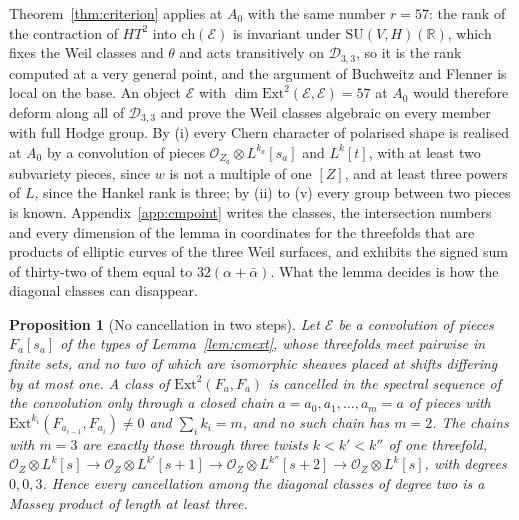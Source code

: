 \documentclass[11pt,reqno]{amsart}
\numberwithin{equation}{section}
\theoremstyle{plain}
\newtheorem{proposition}[theorem]{Proposition}
\theoremstyle{definition}
\newcommand{\RR}{\mathbb{R}}
\newcommand{\Ext}{\mathrm{Ext}}
\newcommand{\ch}{\mathrm{ch}}
\newcommand{\SU}{\mathrm{SU}}
\newcommand{\cD}{\mathcal{D}}
\begin{document}
Theorem~\ref{thm:criterion} applies at $A_{0}$ with the same number $r=57$: the rank of the contraction of $HT^{2}$ into $\ch(\mathcal{E})$ is invariant under $\SU(V,H)(\RR)$, which fixes the Weil classes and $\theta$ and acts transitively on $\cD_{3,3}$, so it is the rank computed at a very general point, and the argument of Buchweitz and Flenner is local on the base. An object $\mathcal{E}$ with $\dim\Ext^{2}(\mathcal{E},\mathcal{E})=57$ at $A_{0}$ would therefore deform along all of $\cD_{3,3}$ and prove the Weil classes algebraic on every member with full Hodge group. By (i) every Chern character of polarised shape is realised at $A_{0}$ by a convolution of pieces $\mathcal{O}_{Z_{a}}\otimes L^{k_{a}}[s_{a}]$ and $L^{k}[t]$, with at least two subvariety pieces, since $w$ is not a multiple of one $[Z]$, and at least three powers of $L$, since the Hankel rank is three; by (ii) to (v) every group between two pieces is known. Appendix~\ref{app:cmpoint} writes the classes, the intersection numbers and every dimension of the lemma in coordinates for the threefolds that are products of elliptic curves of the three Weil surfaces, and exhibits the signed sum of thirty-two of them equal to $32(\alpha+\bar\alpha)$. What the lemma decides is how the diagonal classes can disappear.

\begin{proposition}[No cancellation in two steps]\label{prop:twostep}
Let $\mathcal{E}$ be a convolution of pieces $F_{a}[s_{a}]$ of the types of Lemma~\ref{lem:cmext}, whose threefolds meet pairwise in finite sets, and no two of which are isomorphic sheaves placed at shifts differing by at most one. A class of $\Ext^{2}(F_{a},F_{a})$ is cancelled in the spectral sequence of the convolution only through a closed chain $a=a_{0},a_{1},\dots,a_{m}=a$ of pieces with $\Ext^{k_{i}}(F_{a_{i-1}},F_{a_{i}})\ne0$ and $\sum_{i}k_{i}=m$, and no such chain has $m=2$. The chains with $m=3$ are exactly those through three twists $k<k'<k''$ of one threefold, $\mathcal{O}_{Z}\otimes L^{k}[s]\to\mathcal{O}_{Z}\otimes L^{k'}[s+1]\to\mathcal{O}_{Z}\otimes L^{k''}[s+2]\to\mathcal{O}_{Z}\otimes L^{k}[s]$, with degrees $0,0,3$. Hence every cancellation among the diagonal classes of degree two is a Massey product of length at least three.
\end{proposition}
\end{document}
